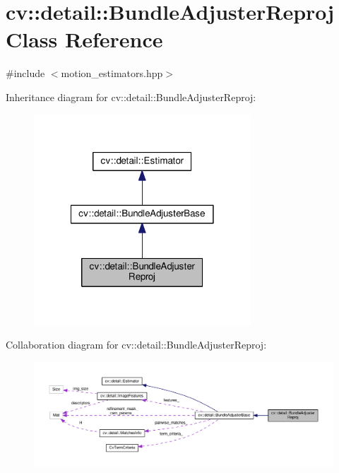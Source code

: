 \hypertarget{classcv_1_1detail_1_1BundleAdjusterReproj}{\section{cv\-:\-:detail\-:\-:Bundle\-Adjuster\-Reproj Class Reference}
\label{classcv_1_1detail_1_1BundleAdjusterReproj}
}


{\ttfamily \#include $<$motion\-\_\-estimators.\-hpp$>$}



Inheritance diagram for cv\-:\-:detail\-:\-:Bundle\-Adjuster\-Reproj\-:\nopagebreak
\begin{figure}[H]
\begin{center}
\leavevmode
\includegraphics[width=230pt]{classcv_1_1detail_1_1BundleAdjusterReproj__inherit__graph}
\end{center}
\end{figure}


Collaboration diagram for cv\-:\-:detail\-:\-:Bundle\-Adjuster\-Reproj\-:\nopagebreak
\begin{figure}[H]
\begin{center}
\leavevmode
\includegraphics[width=350pt]{classcv_1_1detail_1_1BundleAdjusterReproj__coll__graph}
\end{center}
\end{figure}
